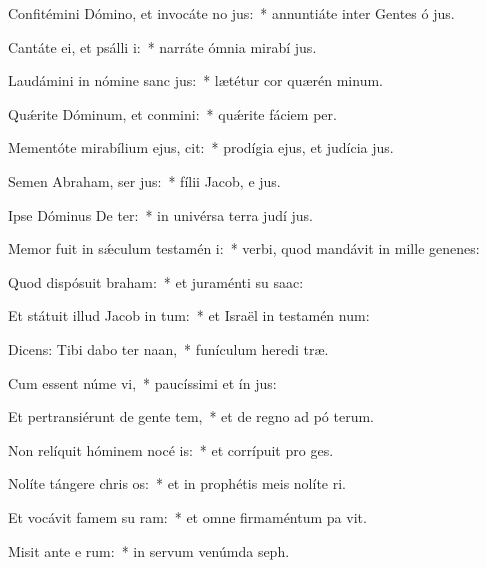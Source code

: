 \item Confitémini Dómino, et invocáte no jus:~* annuntiáte inter Gentes ó jus.
\item Cantáte ei, et psálli i:~* narráte ómnia mirabí jus.
\item Laudámini in nómine sanc jus:~* lætétur cor quærén minum.
\item Quǽrite Dóminum, et conmini:~* quǽrite fáciem  per.
\item Mementóte mirabílium ejus,  cit:~* prodígia ejus, et judícia  jus.
\item Semen Abraham, ser jus:~* fílii Jacob, e jus.
\item Ipse Dóminus De ter:~* in univérsa terra judí jus.
\item Memor fuit in sǽculum testamén i:~* verbi, quod mandávit in mille genenes:
\item Quod dispósuit  braham:~* et juraménti su  saac:
\item Et státuit illud Jacob in tum:~* et Israël in testamén num:
\item Dicens: Tibi dabo ter naan,~* funículum heredi træ.
\item Cum essent núme vi,~* paucíssimi et ín jus:
\item Et pertransiérunt de gente  tem,~* et de regno ad pó terum.
\item Non relíquit hóminem nocé is:~* et corrípuit pro  ges.
\item Nolíte tángere chris os:~* et in prophétis meis nolíte ri.
\item Et vocávit famem su ram:~* et omne firmaméntum pa vit.
\item Misit ante e rum:~* in servum venúmda  seph.
